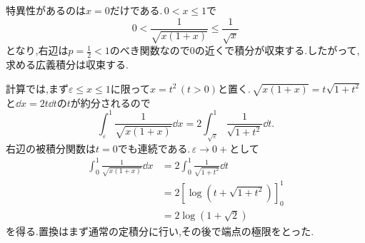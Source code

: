 特異性があるのは$x=0$だけである.\,$0<x\le1$で
\[
 0<\frac1{\sqrt{x(1+x)}}\le\frac1{\sqrt{x}}
\]
となり,右辺は$p=\frac12<1$のべき関数なので$0$の近くで積分が収束する.したがって,求める広義積分は収束する.

計算では,まず$\varepsilon\le x\le1$に限って$x=t^2$\,$(t>0)$と置く.\,$\sqrt{x(1+x)}=t\sqrt{1+t^2}$と$\dd x=2t\dd t$の$t$が約分されるので
\[
 \int_{\varepsilon}^1\frac1{\sqrt{x(1+x)}}\dd x
 =2\int_{\sqrt{\varepsilon}}^1\frac1{\sqrt{1+t^2}}\dd t.
\]
右辺の被積分関数は$t=0$でも連続である.\,$\varepsilon\to0+$として
\begin{align*}
 \int_0^1\frac1{\sqrt{x(1+x)}}\dd x
 &=2\int_0^1\frac1{\sqrt{1+t^2}}\dd t\\
 &=2\left[\log\left(t+\sqrt{1+t^2}\right)\right]_0^1\\
 &=2\log(1+\sqrt2)
\end{align*}
を得る.置換はまず通常の定積分に行い,その後で端点の極限をとった.
